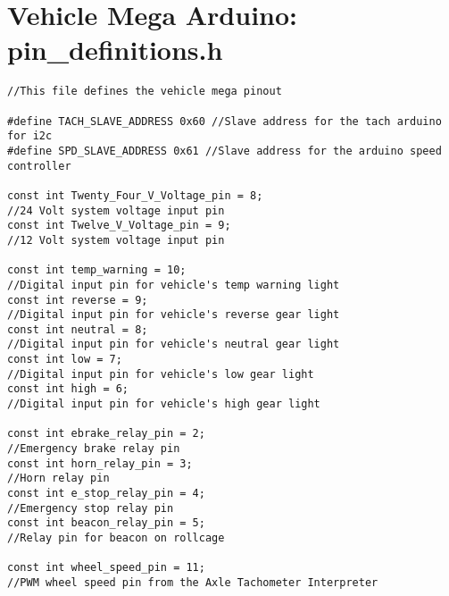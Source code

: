 \section*{Vehicle Mega Arduino: pin\_definitions.h}
\begin{lstlisting}[breaklines=true,basicstyle=\tiny]
//This file defines the vehicle mega pinout

#define TACH_SLAVE_ADDRESS 0x60 //Slave address for the tach arduino for i2c
#define SPD_SLAVE_ADDRESS 0x61 //Slave address for the arduino speed controller

const int Twenty_Four_V_Voltage_pin = 8;                                //24 Volt system voltage input pin
const int Twelve_V_Voltage_pin = 9;                                     //12 Volt system voltage input pin

const int temp_warning = 10;                                            //Digital input pin for vehicle's temp warning light  
const int reverse = 9;                                                  //Digital input pin for vehicle's reverse gear light  
const int neutral = 8;                                                  //Digital input pin for vehicle's neutral gear light                                          
const int low = 7;                                                      //Digital input pin for vehicle's low gear light
const int high = 6;                                                     //Digital input pin for vehicle's high gear light

const int ebrake_relay_pin = 2;                                         //Emergency brake relay pin
const int horn_relay_pin = 3;                                           //Horn relay pin
const int e_stop_relay_pin = 4;                                         //Emergency stop relay pin
const int beacon_relay_pin = 5;                                         //Relay pin for beacon on rollcage

const int wheel_speed_pin = 11;                                         //PWM wheel speed pin from the Axle Tachometer Interpreter

\end{lstlisting}

